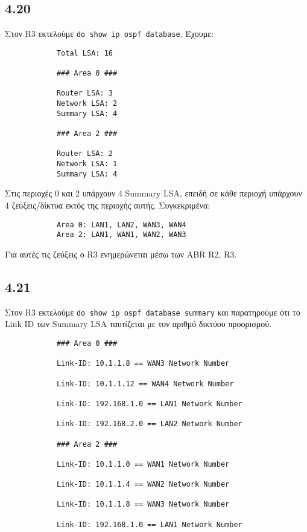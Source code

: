 \documentclass[a4paper, 12pt]{article}
\begin{document}
	\subsection*{4.20}
		Στον R3 εκτελούμε \verb|do show ip ospf database|. Έχουμε:
		
		\begin{verbatim}
			Total LSA: 16
			
			### Area 0 ###
			
			Router LSA: 3
			Network LSA: 2
			Summary LSA: 4
			
			### Area 2 ###
			
			Router LSA: 2
			Network LSA: 1
			Summary LSA: 4
		\end{verbatim}
		
		Στις περιοχές 0 και 2 υπάρχουν 4 Summary LSA, επειδή σε κάθε περιοχή υπάρχουν 4 ζεύξεις/δίκτυα εκτός της περιοχής αυτής. Συγκεκριμένα:
		
		\begin{verbatim}
			Area 0: LAN1, LAN2, WAN3, WAN4
			Area 2: LAN1, WAN1, WAN2, WAN3
		\end{verbatim}
		
		Για αυτές τις ζεύξεις ο R3 ενημερώνεται μέσω των ABR R2, R3.

	\subsection*{4.21}
		Στον R3 εκτελούμε \verb|do show ip ospf database summary| και παρατηρούμε ότι το Link ID των Summary LSA ταυτίζεται με τον αριθμό δικτύου προορισμού.
		
		\begin{verbatim}
			### Area 0 ###
			
			Link-ID: 10.1.1.8 == WAN3 Network Number
			
			Link-ID: 10.1.1.12 == WAN4 Network Number
			
			Link-ID: 192.168.1.0 == LAN1 Network Number
			
			Link-ID: 192.168.2.0 == LAN2 Network Number
			
			### Area 2 ###
			
			Link-ID: 10.1.1.0 == WAN1 Network Number
			
			Link-ID: 10.1.1.4 == WAN2 Network Number
			
			Link-ID: 10.1.1.8 == WAN3 Network Number
			
			Link-ID: 192.168.1.0 == LAN1 Network Number
		\end{verbatim}
\end{document}
